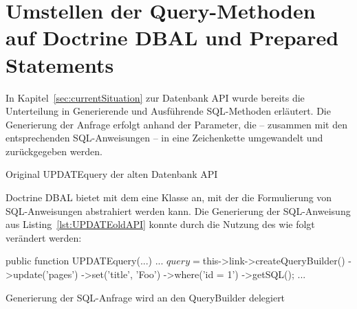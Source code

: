 \section{Umstellen der Query-Methoden auf Doctrine DBAL und Prepared Statements}
\label{prototype:sec:usingDoctrinePreparedStatements}

In Kapitel~\ref{sec:currentSituation} zur Datenbank API wurde bereits die Unterteilung in Generierende und Ausführende SQL-Methoden erläutert. Die Generierung der Anfrage erfolgt anhand der Parameter, die – zusammen mit den entsprechenden SQL-Anweisungen – in eine Zeichenkette umgewandelt und zurückgegeben werden.

\begin{listing}[H]
\begin{phpcode}
public function UPDATEquery($table, $where, array $fields_values, $no_quote_fields = FALSE) {
  ... 
    $fields = array();
	if (is_array($fields_values) && count($fields_values)) {
	  // Quote and escape values
	  $nArr = $this->fullQuoteArray($fields_values, $table, $no_quote_fields, TRUE);
	  foreach ($nArr as $k => $v) {
	    $fields[] = $k . '=' . $v;
	  }
	}
	
	$query = 'UPDATE ' . $table . ' SET ' . implode(',', $fields) .
		((string)$where !== '' ? ' WHERE ' . $where : '');
	...
	return $query;
  }
}
\end{phpcode}
\caption{Original UPDATEquery der alten Datenbank API}
\label{lst:UPDATEoldAPI}
\end{listing}

Doctrine DBAL bietet mit dem  eine Klasse an, mit der die Formulierung von SQL-Anweisungen abstrahiert werden kann. Die Generierung der SQL-Anweisung aus Listing~\ref{lst:UPDATEoldAPI} konnte durch die Nutzung des  wie folgt verändert werden:

\begin{listing}[H]
\begin{phpcode}
public function UPDATEquery(...) {
...
  $query = $this->link->createQueryBuilder()
    ->update('pages')
    ->set('title', 'Foo')
    ->where('id = 1')
    ->getSQL();
...
}
\end{phpcode}
\caption{Generierung der SQL-Anfrage wird an den QueryBuilder delegiert}
\label{lst:createSqlByDirectCallToQueryBuilder}
\end{listing}

